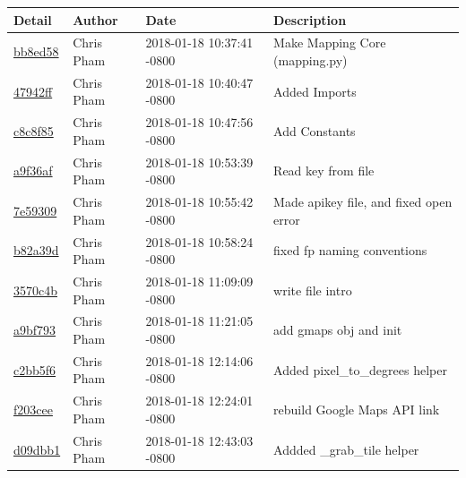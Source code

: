 \begin{center}
\begin{tabular}{l l l l}	\textbf{Detail} & \textbf{Author} & \textbf{Date} &\textbf{Description}\\\hline
\href{https://github.com/OSURoboticsClub/Rover_2017_2018/commit/bb8ed586e278eaa18b1861a0949afa53a743c876}{bb8ed58} & Chris Pham & 2018-01-18 10:37:41 -0800 &Make Mapping Core (mapping.py)\\\hline
\href{https://github.com/OSURoboticsClub/Rover_2017_2018/commit/47942ffd1dcc2b3a1e29776d00a005f5a4247ea3}{47942ff} & Chris Pham & 2018-01-18 10:40:47 -0800 &Added Imports\\\hline
\href{https://github.com/OSURoboticsClub/Rover_2017_2018/commit/c8c8f857cd2de7d01a5c790a22ac643a6b962436}{c8c8f85} & Chris Pham & 2018-01-18 10:47:56 -0800 &Add Constants\\\hline
\href{https://github.com/OSURoboticsClub/Rover_2017_2018/commit/a9f36af40d4c3a00bb2336852d0db329f3b5905e}{a9f36af} & Chris Pham & 2018-01-18 10:53:39 -0800 &Read key from file\\\hline
\href{https://github.com/OSURoboticsClub/Rover_2017_2018/commit/7e593097eab330b71a54b56251a1bea11e31a72c}{7e59309} & Chris Pham & 2018-01-18 10:55:42 -0800 &Made apikey file, and fixed open error\\\hline
\href{https://github.com/OSURoboticsClub/Rover_2017_2018/commit/b82a39d3bf666abd8ed38839d6c5730b09e6ad04}{b82a39d} & Chris Pham & 2018-01-18 10:58:24 -0800 &fixed fp naming conventions\\\hline
\href{https://github.com/OSURoboticsClub/Rover_2017_2018/commit/3570c4b5735bc2dbdf39bb5f52d34ccaa5bbee7e}{3570c4b} & Chris Pham & 2018-01-18 11:09:09 -0800 &write file intro\\\hline
\href{https://github.com/OSURoboticsClub/Rover_2017_2018/commit/a9bf793bfc0db615d7d62bef7ac1d56f81c38d6c}{a9bf793} & Chris Pham & 2018-01-18 11:21:05 -0800 &add gmaps obj and init\\\hline
\href{https://github.com/OSURoboticsClub/Rover_2017_2018/commit/c2bb5f6d31e6457d59e207c5f87edeeb2ac50e11}{c2bb5f6} & Chris Pham & 2018-01-18 12:14:06 -0800 &Added pixel\_to\_degrees helper\\\hline
\href{https://github.com/OSURoboticsClub/Rover_2017_2018/commit/f203cee53e0a60c4dc8eed40dfae0a07e4649e59}{f203cee} & Chris Pham & 2018-01-18 12:24:01 -0800 &rebuild Google Maps API link\\\hline
\href{https://github.com/OSURoboticsClub/Rover_2017_2018/commit/d09dbb1a02bc8883bc16e68aa8de74ee1b6ecfe6}{d09dbb1} & Chris Pham & 2018-01-18 12:43:03 -0800 &Addded \_grab\_tile helper\\\hline

\end{tabular}
\end{center}

